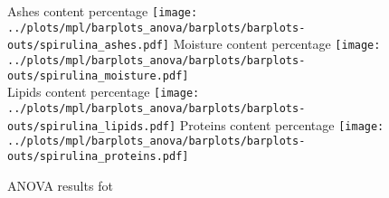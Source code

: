 
\begin{figure}[H]
\centering
	\subcaptionbox%
	{Ashes content percentage\label{subfig:spirulina_ashes}}%
		{\texttt{[image: ../plots/mpl/barplots\_anova/barplots/barplots-outs/spirulina\_ashes.pdf]}}%
\hspace*{\hbtwsfig}%
	\subcaptionbox%
	{Moisture content percentage\label{subfig:spirulina_moisture}}%
		{\texttt{[image: ../plots/mpl/barplots\_anova/barplots/barplots-outs/spirulina\_moisture.pdf]}}%
\\[2ex]
	\subcaptionbox%
	{Lipids content percentage\label{subfig:spirulina_lipids}}%
		{\texttt{[image: ../plots/mpl/barplots\_anova/barplots/barplots-outs/spirulina\_lipids.pdf]}}%
\hspace*{\hbtwsfig}%
	\subcaptionbox%
	{Proteins content percentage\label{subfig:spirulina_proteins}}%
		{\texttt{[image: ../plots/mpl/barplots\_anova/barplots/barplots-outs/spirulina\_proteins.pdf]}}%
\caption%
{ANOVA results fot }
\label{fig:spirulinabla}
\end{figure}
